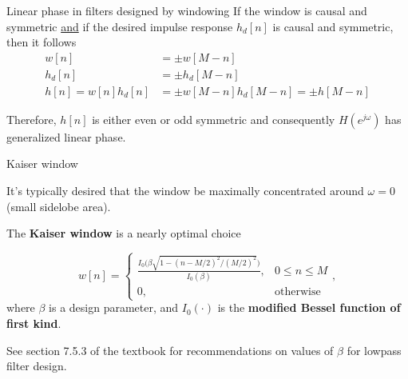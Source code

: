\documentclass[10pt, handout]{beamer}
\begin{document}
%
\begin{frame}{Linear phase in filters designed by windowing}
	If the window is causal and symmetric \underline{and} if the desired impulse response $h_d[n]$ is causal and symmetric, then it follows
	\begin{align}
		w[n] &= \pm w[M-n] \tag{causal and symmetric window} \\
		h_d[n] &= \pm h_d[M-n] \tag{causal and symmetric $h_d[n]$} \\
		h[n] = w[n]h_d[n] &= \pm w[M-n]h_d[M-n] = \pm h[M-n] \tag{causal and symmetric $h[n]$}
	\end{align}
	
	Therefore, $h[n]$ is either even or odd symmetric and consequently $H(e^{j\omega})$ has generalized linear phase.
	
\end{frame}

%
\begin{frame}{Kaiser window}

It's typically desired that the window be maximally concentrated around $\omega = 0$ (small sidelobe area).

The \textbf{Kaiser window} is a nearly optimal choice

\begin{equation*}
	w[n] = \begin{cases}
	\displaystyle\frac{I_0\Big(\beta\sqrt{1- (n-M/2)^2/(M/2)^2}\Big)}{I_0(\beta)}, & 0 \leq n \leq M \\
	0, & \text{otherwise}
	\end{cases},
\end{equation*}
where $\beta$ is a design parameter, and $I_0(\cdot)$ is the \textbf{modified Bessel function of first kind}.

See section 7.5.3 of the textbook for recommendations on values of $\beta$ for lowpass filter design.

\end{frame}
\end{document}
